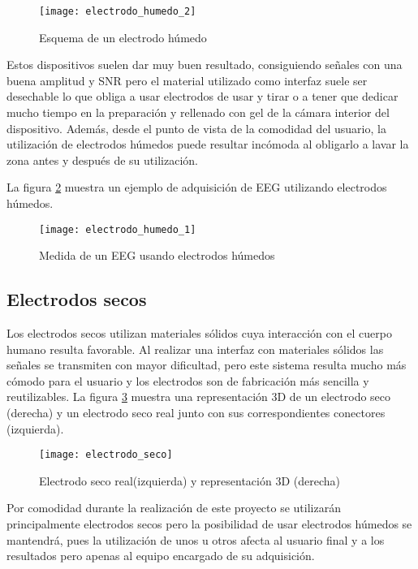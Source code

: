 \begin{figure} [H]
    \centering
    \texttt{[image: electrodo\_humedo\_2]}
    \caption{Esquema de un electrodo húmedo \cite{apuntes}}
    \label{fig:electrodo_humedo_2}
\end{figure}

Estos dispositivos suelen dar muy buen resultado, consiguiendo señales con una buena amplitud y \acrshort{SNR} pero el material utilizado como interfaz suele ser desechable lo que obliga a usar electrodos de usar y tirar o a tener que dedicar mucho tiempo en la preparación y rellenado con gel de la cámara interior del dispositivo. Además, desde el punto de vista de la comodidad del usuario, la utilización de electrodos húmedos puede resultar incómoda al obligarlo a lavar la zona antes y después de su utilización.

La figura \ref{fig:electrodo_humedo_1} muestra un ejemplo de adquisición de \acrshort{EEG} utilizando electrodos húmedos.

\begin{figure} [h]
    \centering
    \texttt{[image: electrodo\_humedo\_1]}
    \caption{Medida de un EEG usando electrodos húmedos \cite{apuntes}}
    \label{fig:electrodo_humedo_1}
\end{figure}

\clearpage

\subsection{Electrodos secos\label{sec:Elec_secos}}

Los electrodos secos utilizan materiales sólidos cuya interacción con el cuerpo humano resulta favorable. Al realizar una interfaz con materiales sólidos las señales se transmiten con mayor dificultad, pero este sistema resulta mucho más cómodo para el usuario y los electrodos son de fabricación más sencilla y reutilizables. La figura \ref{fig:electrodo_seco} muestra una representación 3D de un electrodo seco (derecha) y un electrodo seco real junto con sus correspondientes conectores (izquierda).

\begin{figure} [h]
    \centering
    \texttt{[image: electrodo\_seco]}
    \caption{Electrodo seco real(izquierda) y representación 3D (derecha) \cite{apuntes}}
    \label{fig:electrodo_seco}
\end{figure}

Por comodidad durante la realización de este proyecto se utilizarán principalmente electrodos secos pero la posibilidad de usar electrodos húmedos se mantendrá, pues la utilización de unos u otros afecta al usuario final y a los resultados pero apenas al equipo encargado de su adquisición.
